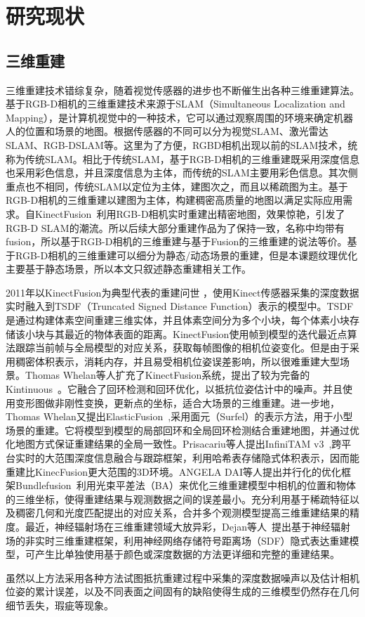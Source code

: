 \section{研究现状}
\subsection{三维重建}
三维重建技术错综复杂，随着视觉传感器的进步也不断催生出各种三维重建算法。基于RGB-D相机的三维重建技术来源于SLAM（Simultaneous Localization and Mapping），是计算机视觉中的一种技术，它可以通过观察周围的环境来确定机器人的位置和场景的地图。根据传感器的不同可以分为视觉SLAM、激光雷达SLAM、RGB-DSLAM等。这里为了方便，RGBD相机出现以前的SLAM技术，统称为传统SLAM。相比于传统SLAM，基于RGB-D相机的三维重建既采用深度信息也采用彩色信息，并且深度信息为主体，而传统的SLAM主要用彩色信息。其次侧重点也不相同，传统SLAM以定位为主体，建图次之，而且以稀疏图为主。基于RGB-D相机的三维重建以建图为主体，构建稠密高质量的地图以满足实际应用需求。自KinectFusion~\cite{RichardNewcombe2011KinectFusionRD}利用RGB-D相机实时重建出精密地图，效果惊艳，引发了RGB-D SLAM的潮流。所以后续大部分重建作品为了保持一致，名称中均带有fusion，所以基于RGB-D相机的三维重建与基于Fusion的三维重建的说法等价。基于RGB-D相机的三维重建可以细分为静态/动态场景的重建，但是本课题纹理优化主要基于静态场景，所以本文只叙述静态重建相关工作。\par
2011年以KinectFusion\cite{RichardNewcombe2011KinectFusionRD}为典型代表的重建问世
，使用Kinect传感器采集的深度数据实时融入到TSDF（Truncated Signed Distance Function）表示的模型中。TSDF是通过构建体素空间重建三维实体，并且体素空间分为多个小块，每个体素小块存储该小块与其最近的物体表面的距离。KinectFusion使用帧到模型的迭代最近点算法跟踪当前帧与全局模型的对应关系，获取每帧图像的相机位姿变化。但是由于采用稠密体积表示，消耗内存，并且易受相机位姿误差影响，所以很难重建大型场景。Thomas Whelan等人扩充了KinectFusion系统，提出了较为完备的Kintinuous~\cite{ThomasWhelan2012KintinuousSE}。它融合了回环检测和回环优化，以抵抗位姿估计中的噪声。并且使用变形图做非刚性变换，更新点的坐标，适合大场景的三维重建。进一步地，Thomas Whelan又提出ElasticFusion~\cite{ThomasWhelan2015ElasticFusionDS},采用面元（Surfel）的表示方法，用于小型场景的重建。它将模型到模型的局部回环和全局回环检测结合重建地图，并通过优化地图方式保证重建结果的全局一致性。Prisacariu等人提出InfiniTAM v3~\cite{VictorAdrianPrisacariu2017InfiniTAMVA},跨平台实时的大范围深度信息融合与跟踪框架，利用哈希表存储隐式体积表示，因而能重建比KinecFusion更大范围的3D环境。ANGELA DAI等人提出并行化的优化框架Bundlefusion~\cite{AngelaDai2016BundleFusionRG}利用光束平差法（BA）来优化三维重建模型中相机的位置和物体的三维坐标，使得重建结果与观测数据之间的误差最小。充分利用基于稀疏特征以及稠密几何和光度匹配提出的对应关系，合并多个观测模型提高三维重建结果的精度。最近，神经辐射场在三维重建领域大放异彩，Dejan等人~\cite{DejanAzinovic2021NeuralRS}提出基于神经辐射场的非实时三维重建框架，利用神经网络存储符号距离场（SDF）隐式表达重建模型，可产生比单独使用基于颜色或深度数据的方法更详细和完整的重建结果。\par
虽然以上方法采用各种方法试图抵抗重建过程中采集的深度数据噪声以及估计相机位姿的累计误差，以及不同表面之间固有的缺陷使得生成的三维模型仍然存在几何细节丢失，瑕疵等现象。

